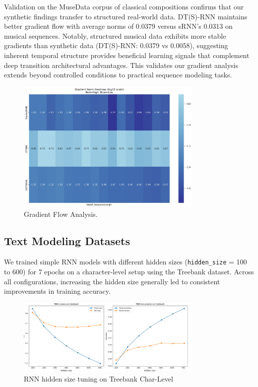 \documentclass{article}
\begin{document}
Validation on the MuseData corpus of classical compositions confirms that our synthetic findings transfer to structured real-world data. DT(S)-RNN maintains better gradient flow with average norms of 0.0379 versus sRNN's 0.0313 on musical sequences. Notably, structured musical data exhibits more stable gradients than synthetic data (DT(S)-RNN: 0.0379 vs 0.0058), suggesting inherent temporal structure provides beneficial learning signals that complement deep transition architectural advantages. This validates our gradient analysis extends beyond controlled conditions to practical sequence modeling tasks.

\begin{figure}[ht]
    \centering
    \includegraphics[width=0.8\textwidth]{Gradient Flow Analysis/gradient_flow.jpeg}
    \caption{Gradient Flow Analysis.}
    \label{fig:gradient_heatmap}
\end{figure}

\subsection{Text Modeling Datasets}

We trained simple RNN models with different hidden sizes (\texttt{hidden\_size} = 100 to 600) for 7 epochs on a character-level setup using the Treebank dataset. Across all configurations, increasing the hidden size generally led to consistent improvements in training accuracy.

\begin{figure}[H]
    \centering
    \includegraphics[width=0.8\textwidth]{treebank_charlevel_plots/rnn_hiddensize_treebank_charlevel_RIGHT_LABEL.png}
    \caption{RNN hidden size tuning on Treebank Char-Level}
    \label{fig:RNN Hidden Size tuning}
\end{figure}
\end{document}
